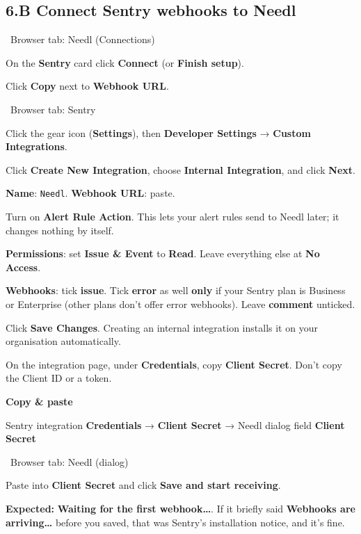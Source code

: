 \documentclass[11pt,a4paper]{article}
\newcommand{\ui}[1]{\textbf{#1}}
\newcommand{\where}[1]{\par\smallskip\noindent\colorbox{winbg}{\color{winfg}\bfseries\strut\ #1\ }\par\nopagebreak[4]}
\newcommand{\lit}[1]{\texttt{#1}}
\newenvironment{xfer}{\def\FrameCommand{\fboxsep=6pt\colorbox{xferbg}}\MakeFramed{\advance\hsize-\width\FrameRestore}\textbf{Copy \& paste}\par}{\endMakeFramed}
\begin{document}
\subsection*{6.B Connect Sentry webhooks to Needl}
\where{Browser tab: Needl (Connections)}
\begin{steps}
\item On the \ui{Sentry} card click \ui{Connect} (or \ui{Finish setup}).
\item Click \ui{Copy} next to \ui{Webhook URL}.
\end{steps}
\where{Browser tab: Sentry}
\begin{steps}[resume]
\item Click the gear icon (\ui{Settings}), then \ui{Developer Settings} → \ui{Custom Integrations}.
\item Click \ui{Create New Integration}, choose \ui{Internal Integration}, and click \ui{Next}.
\item \ui{Name}: \lit{Needl}. \ui{Webhook URL}: paste.
\item Turn on \ui{Alert Rule Action}. This lets your alert rules send to Needl later; it changes nothing by itself.
\item \ui{Permissions}: set \ui{Issue \& Event} to \ui{Read}. Leave everything else at \ui{No Access}.
\item \ui{Webhooks}: tick \ui{issue}. Tick \ui{error} as well \textbf{only} if your Sentry plan is Business or Enterprise (other plans don't offer error webhooks). Leave \ui{comment} unticked.
\item Click \ui{Save Changes}. Creating an internal integration installs it on your organisation automatically.
\item On the integration page, under \ui{Credentials}, copy \ui{Client Secret}. Don't copy the Client ID or a token.
\end{steps}
\begin{xfer}
Sentry integration \ui{Credentials} → \ui{Client Secret} → Needl dialog field \ui{Client Secret}
\end{xfer}
\where{Browser tab: Needl (dialog)}
\begin{steps}[resume]
\item Paste into \ui{Client Secret} and click \ui{Save and start receiving}.
\item \textbf{Expected:} \ui{Waiting for the first webhook…}. If it briefly said \ui{Webhooks are arriving…} before you saved, that was Sentry's installation notice, and it's fine.
\end{steps}
\end{document}

